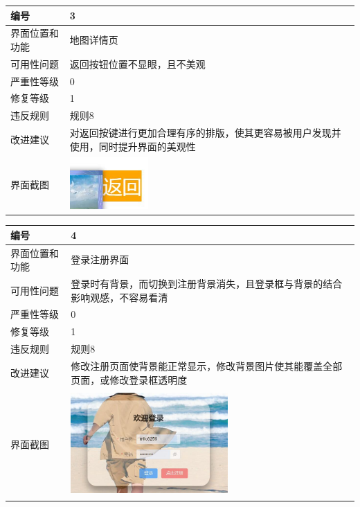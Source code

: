 \documentclass[a4paper,12pt]{article}
\begin{document}
\vspace{2em}

\begin{tabular}{|m{3cm}<{\centering}|p{10cm}|}
	\hline
	编号 & 3 \\
	\hline
	界面位置和功能 & 地图详情页 \\
	\hline
	可用性问题 & 返回按钮位置不显眼，且不美观 \\
	\hline
	严重性等级 & 0 \\
	\hline
	修复等级 & 1 \\
	\hline
	违反规则 & 规则8 \\
	\hline
	改进建议 & 对返回按键进行更加合理有序的排版，使其更容易被用户发现并使用，同时提升界面的美观性 \\
	\hline
	界面截图 & \includegraphics[width=3cm, height=2cm]{q3.jpg} \\
	\hline
\end{tabular}

\vspace{2em}

\begin{tabular}{|m{3cm}<{\centering}|p{10cm}|}
	\hline
	编号 & 4 \\
	\hline
	界面位置和功能 & 登录注册界面 \\
	\hline
	可用性问题 & 登录时有背景，而切换到注册背景消失，且登录框与背景的结合影响观感，不容易看清 \\
	\hline
	严重性等级 & 0 \\
	\hline
	修复等级 & 1 \\
	\hline
	违反规则 & 规则8 \\
	\hline
	改进建议 & 修改注册页面使背景能正常显示，修改背景图片使其能覆盖全部页面，或修改登录框透明度 \\
	\hline
	界面截图 & \includegraphics[width=6cm, height=4cm]{q4.jpg} \\
	\hline
\end{tabular}
\end{document}
